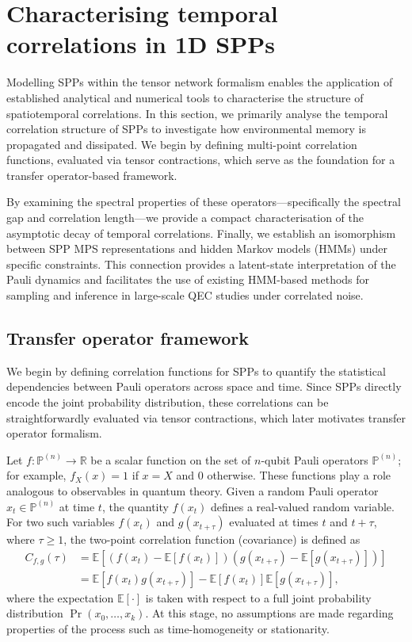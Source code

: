 \section{Characterising temporal correlations in 1D SPPs}\label{sec:correlation-structure}
Modelling SPPs within the tensor network formalism enables the application of established analytical and numerical tools to characterise the structure of spatiotemporal correlations. In this section, we primarily analyse the temporal correlation structure of SPPs to investigate how environmental memory is propagated and dissipated. We begin by defining multi-point correlation functions, evaluated via tensor contractions, which serve as the foundation for a transfer operator-based framework.

By examining the spectral properties of these operators---specifically the spectral gap and correlation length---we provide a compact characterisation of the asymptotic decay of temporal correlations. Finally, we establish an isomorphism between SPP MPS representations and hidden Markov models (HMMs) under specific constraints. This connection provides a latent-state interpretation of the Pauli dynamics and facilitates the use of existing HMM-based methods for sampling and inference in large-scale QEC studies under correlated noise.

\subsection{Transfer operator framework}\label{sec:correlation-functions}
We begin by defining correlation functions for SPPs to quantify the statistical dependencies between Pauli operators across space and time. Since SPPs directly encode the joint probability distribution, these correlations can be straightforwardly evaluated via tensor contractions, which later motivates transfer operator formalism.

Let \(f : \mathbb{P}^{(n)} \to \mathbb{R}\) be a scalar function on the set of \(n\)-qubit Pauli operators \(\mathbb{P}^{(n)}\); for example, \(f_X(x) = 1\) if \(x=X\) and 0 otherwise. These functions play a role analogous to observables in quantum theory. Given a random Pauli operator \(x_t \in \mathbb{P}^{(n)}\) at time \(t\), the quantity \(f(x_t)\) defines a real-valued random variable. For two such variables \(f(x_t)\) and \(g(x_{t+\tau})\) evaluated at times \(t\) and \(t+\tau\), where \(\tau \geq 1\), the two-point correlation function (covariance) is defined as 
\begin{equation}
    \begin{split}
        C_{f,g}(\tau) 
        &= \mathbb{E}[(f(x_t) - \mathbb{E}[f(x_t)])(g(x_{t+\tau}) - \mathbb{E}[g(x_{t+\tau})])] \\
        &= \mathbb{E}[f(x_t) g(x_{t+\tau})] - \mathbb{E}[f(x_t)] \mathbb{E}[g(x_{t+\tau})],
    \end{split}
\end{equation}
where the expectation \(\mathbb{E}[\cdot]\) is taken with respect to a full joint probability distribution \(\Pr{(x_0,\dots,x_k)}\). At this stage, no assumptions are made regarding properties of the process such as time-homogeneity or stationarity.

